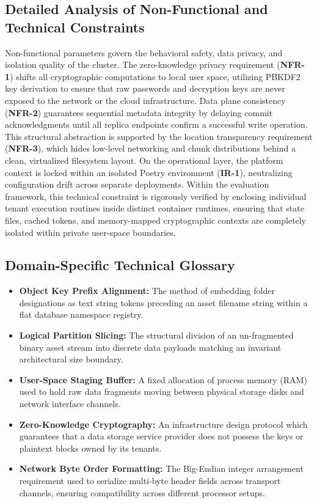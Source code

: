 \subsection{Detailed Analysis of Non-Functional and Technical Constraints}
Non-functional parameters govern the behavioral safety, data privacy, and isolation quality of the cluster. The zero-knowledge privacy requirement (\textbf{NFR-1}) shifts all cryptographic computations to local user space, utilizing PBKDF2 key derivation to ensure that raw passwords and decryption keys are never exposed to the network or the cloud infrastructure. Data plane consistency (\textbf{NFR-2}) guarantees sequential metadata integrity by delaying commit acknowledgments until all replica endpoints confirm a successful write operation. This structural abstraction is supported by the location transparency requirement (\textbf{NFR-3}), which hides low-level networking and chunk distributions behind a clean, virtualized filesystem layout. On the operational layer, the platform context is locked within an isolated Poetry environment (\textbf{IR-1}), neutralizing configuration drift across separate deployments. Within the evaluation framework, this technical constraint is rigorously verified by enclosing individual tenant execution routines inside distinct container runtimes, ensuring that state files, cached tokens, and memory-mapped cryptographic contexts are completely isolated within private user-space boundaries.

\subsection{Domain-Specific Technical Glossary}
\begin{itemize}
    \item \textbf{Object Key Prefix Alignment:} The method of embedding folder designations as text string tokens preceding an asset filename string within a flat database namespace registry.
    \item \textbf{Logical Partition Slicing:} The structural division of an un-fragmented binary asset stream into discrete data payloads matching an invariant architectural size boundary.
    \item \textbf{User-Space Staging Buffer:} A fixed allocation of process memory (RAM) used to hold raw data fragments moving between physical storage disks and network interface channels.
    \item \textbf{Zero-Knowledge Cryptography:} An infrastructure design protocol which guarantees that a data storage service provider does not possess the keys or plaintext blocks owned by its tenants.
    \item \textbf{Network Byte Order Formatting:} The Big-Endian integer arrangement requirement used to serialize multi-byte header fields across transport channels, ensuring compatibility across different processor setups.
\end{itemize}

